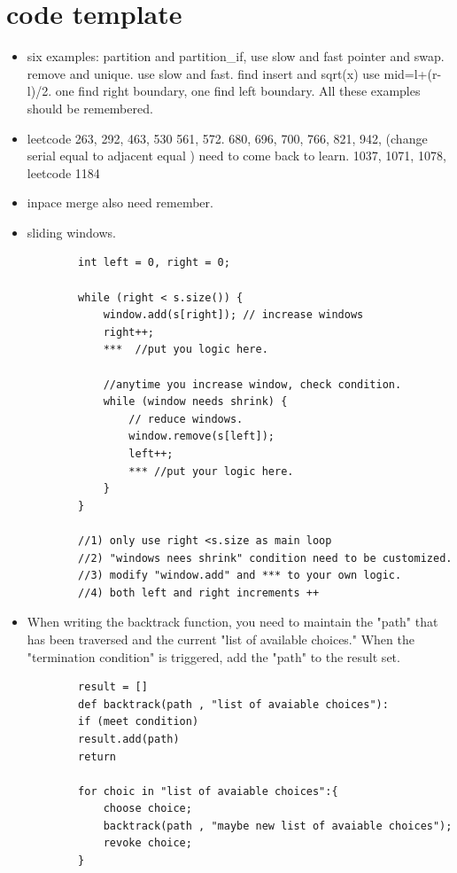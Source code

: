 \documentclass[a4paper,11pt,twoside]{book}
\begin{document}
\section{code template}
\begin{itemize}
	
	\item six examples: partition and partition\_if, use slow and fast pointer and swap.  remove and unique. use slow and fast. find insert and sqrt(x) use mid=l+(r-l)/2.  one find right boundary, one find left boundary.  All these examples should be remembered. 
	
	\item leetcode 263, 292, 463, 530 561, 572. 680, 696, 700, 766, 821, 942,  (change serial equal to adjacent equal ) need to come back to learn. 1037, 1071, 1078, leetcode 1184 
	
	\item inpace merge also need remember. 
	
	\item sliding windows. 
	
	\begin{lstlisting}
		int left = 0, right = 0;
		
		while (right < s.size()) {
			window.add(s[right]); // increase windows
			right++;
			***  //put you logic here.
			
			//anytime you increase window, check condition. 
			while (window needs shrink) {
				// reduce windows.
				window.remove(s[left]);
				left++;
				*** //put your logic here. 
			}
		}
		
		//1) only use right <s.size as main loop
		//2) "windows nees shrink" condition need to be customized. 
		//3) modify "window.add" and *** to your own logic. 
		//4) both left and right increments ++
	\end{lstlisting}
	
	\item When writing the backtrack function, you need to maintain the "path" that has been traversed and the current "list of available choices." When the "termination condition" is triggered, add the "path" to the result set.
	
	\begin{lstlisting}
		result = []
		def backtrack(path , "list of avaiable choices"):
		if (meet condition)
		result.add(path)
		return
		
		for choic in "list of avaiable choices":{
			choose choice;
			backtrack(path , "maybe new list of avaiable choices");
			revoke choice;
		}	
	\end{lstlisting}
	

\end{itemize}
\end{document}
